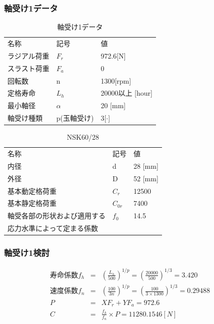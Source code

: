 \documentclass[a4j,twoside,openright,11pt]{jreport}
\begin{document}
\subsubsection{軸受け1データ}
\begin{table}[htb]
\begin{center}
  \caption{軸受け1データ}
  \begin{tabular}{lll} \hline
名称&記号&値\\
ラジアル荷重&$F_r$&972.6[N]\\
スラスト荷重&$F_a$&0\\
回転数&n&1300[rpm]\\
定格寿命&$L_h$&20000以上 [hour]\\
最小軸径&$\alpha$&20 [mm]\\
軸受け種類&p(玉軸受け)&3[$\cdot$]\\
\hline
  \end{tabular}
\end{center}
\end{table}

\begin{table}[htb]
\begin{center}
  \caption{NSK60/28}
  \begin{tabular}{lll} \hline
名称&記号&値\\
内径& d &28 [mm]\\
外径& D &52 [mm]\\
基本動定格荷重&$C_{r}$&12500\\
基本静定格荷重&$C_{0r}$&7400\\
軸受各部の形状および適用する&$f_0$&14.5\\
応力水準によって定まる係数&&\\
\hline
  \end{tabular}
\end{center}
\end{table}


\subsubsection{軸受け1検討}
\begin{eqnarray}
寿命係数f_h &=& \left( \frac{L_h}{500} \right)^{1/p} = \left( \frac{20000}{500} \right)^{1/3} = 3.420\\
速度係数f_n &=& \left( \frac{100}{3n} \right)^{1/p} = \left( \frac{100}{3 \times 1300} \right)^{1/3} = 0.29488\\
P &=& XF_r+YF_a = 972.6\\
C &=& \frac{f_h}{f_n} \times P = 11280.1546[N]
\end{eqnarray}
\end{document}
